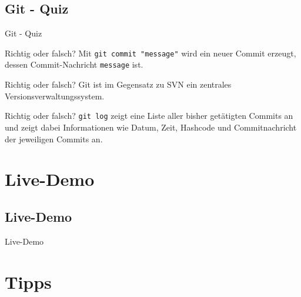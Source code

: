 \documentclass[18pt]{beamer}
\begin{document}
	\subsection{Git - Quiz}
	\begin{frame}{Git - Quiz}
		\begin{block}{Richtig oder falsch?}
			Mit \texttt{git commit "message"} wird ein neuer Commit erzeugt, dessen Commit-Nachricht \texttt{message} ist.
		\end{block}
		\pause
		\begin{block}{Richtig oder falsch?}
			Git ist im Gegensatz zu SVN ein zentrales Versionsverwaltungssystem.
		\end{block}
		\begin{block}{Richtig oder falsch?}
			\texttt{git log} zeigt eine Liste aller bisher getätigten Commits an und zeigt dabei Informationen wie Datum, Zeit, Hashcode und Commitnachricht der jeweiligen Commits an.
		\end{block}
	\end{frame}
		
\section{Live-Demo}		
	\subsection{Live-Demo}
	\begin{frame}
		\centering Live-Demo
	\end{frame}
		
\section{Tipps}
\end{document}
